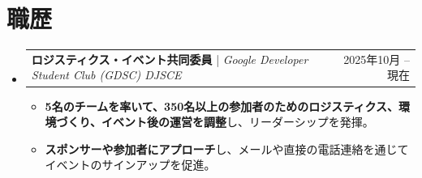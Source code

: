 \documentclass[letterpaper,10pt]{article}
\makeatletter
\newcommand{\resumeItem}[1]{
  \item\small{#1}
}
\newcommand{\resumeProjectHeading}[2]{
    \item
    \begin{tabular*}{0.98\textwidth}[t]{l@{\extracolsep{\fill}}r}
      \small#1 & \small#2 \\
    \end{tabular*}\vspace{2pt}
}
\newcommand{\resumeSubHeadingListStart}{\begin{itemize}[leftmargin=0.12in, label={}, itemsep=5pt, parsep=0pt, topsep=2pt]}
\newcommand{\resumeSubHeadingListEnd}{\end{itemize}}
\newcommand{\resumeItemListStart}{\begin{itemize}[leftmargin=0.18in, itemsep=3pt, parsep=0pt, topsep=1pt, partopsep=0pt]}
\newcommand{\resumeItemListEnd}{\end{itemize}\vspace{1pt}}
\makeatother
\begin{document}
\section{職歴}
  \resumeSubHeadingListStart
    \resumeProjectHeading
      {\textbf{ロジスティクス・イベント共同委員} | \emph{Google Developer Student Club (GDSC) DJSCE}}{2025年10月 -- 現在}
      \resumeItemListStart
        \resumeItem{\textbf{5名のチームを率いて、350名以上の参加者のためのロジスティクス、環境づくり、イベント後の運営を調整}し、リーダーシップを発揮。}
        \resumeItem{\textbf{スポンサーや参加者にアプローチ}し、メールや直接の電話連絡を通じてイベントのサインアップを促進。}
      \resumeItemListEnd
  \resumeSubHeadingListEnd
\end{document}
